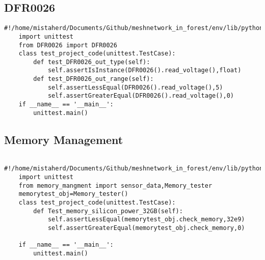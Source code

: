 \subsection{DFR0026}
\begin{lstlisting}[style=mystyle,caption={Code for unit test of DFR0026}]
    #!/home/mistaherd/Documents/Github/meshnetwork_in_forest/env/lib/python3.11
    import unittest
    from DFR0026 import DFR0026
    class test_project_code(unittest.TestCase):
        def test_DFR0026_out_type(self):
            self.assertIsInstance(DFR0026().read_voltage(),float)
        def test_DFR0026_out_range(self):
            self.assertLessEqual(DFR0026().read_voltage(),5)
            self.assertGreaterEqual(DFR0026().read_voltage(),0)
    if __name__ == '__main__':
        unittest.main()    
\end{lstlisting}
\newpage
\subsection{Memory Management}
\begin{lstlisting}
    #!/home/mistaherd/Documents/Github/meshnetwork_in_forest/env/lib/python3.11
    import unittest
    from memory_mangment import sensor_data,Memory_tester
    memorytest_obj=Memory_tester()
    class test_project_code(unittest.TestCase):
        def Test_memory_silicon_power_32GB(self):
            self.assertLessEqual(memorytest_obj.check_memory,32e9)
            self.assertGreaterEqual(memorytest_obj.check_memory,0)
    
    if __name__ == '__main__':
        unittest.main()
\end{lstlisting}
